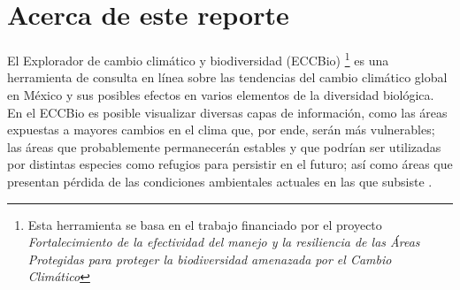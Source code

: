 \documentclass{article}
\begin{document}
	
	\tableofcontents
	\section*{Acerca de este reporte}
	El Explorador de cambio clim\'atico y biodiversidad (ECCBio) \footnote{Esta herramienta se basa en el trabajo financiado por el proyecto \emph{Fortalecimiento de la efectividad del manejo y la resiliencia de las \'Areas Protegidas para proteger la biodiversidad amenazada por el Cambio Clim\'atico}} es una herramienta de consulta en l\'inea sobre las tendencias del cambio clim\'atico global en M\'exico y sus posibles efectos en varios elementos de la diversidad biol\'ogica. En el ECCBio es posible visualizar diversas capas de informaci\'on, como las \'areas expuestas a mayores cambios en el clima que, por ende, ser\'an m\'as vulnerables; las \'areas que probablemente permanecer\'an estables y que podr\'ian ser utilizadas por distintas especies como refugios para persistir en el futuro; as\'i como \'areas que presentan p\'erdida de las condiciones ambientales actuales en las que subsiste \cite{Nobody06}.
	\newpage








\end{document}
